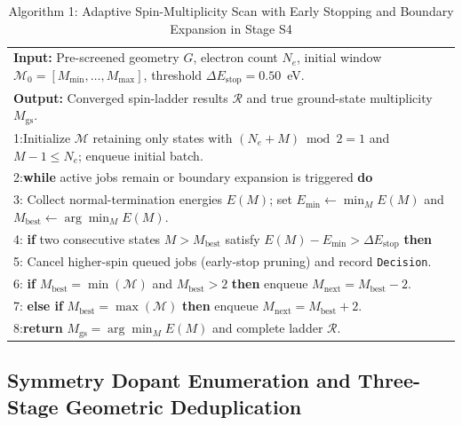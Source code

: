 \documentclass[journal=jcisd8,manuscript=article]{achemso}
\begin{document}
\begin{table}[htbp]
  \centering
  \caption{Algorithm 1: Adaptive Spin-Multiplicity Scan with Early Stopping and Boundary Expansion in Stage S4}
  \label{tab:alg1}
  \small
  \begin{tabular}{p{14.8cm}}
    \toprule
    \textbf{Input:} Pre-screened geometry $G$, electron count $N_e$, initial window $\mathcal{M}_0 = [M_{\min}, \dots, M_{\max}]$, threshold $\Delta E_{\text{stop}} = 0.50$~eV. \\
    \textbf{Output:} Converged spin-ladder results $\mathcal{R}$ and true ground-state multiplicity $M_{\text{gs}}$. \\
    \midrule
    1:\quad Initialize $\mathcal{M}$ retaining only states with $(N_e + M) \bmod 2 = 1$ and $M - 1 \le N_e$; enqueue initial batch. \\
    2:\quad \textbf{while} active jobs remain or boundary expansion is triggered \textbf{do} \\
    3:\quad \hspace{1.2em} Collect normal-termination energies $E(M)$; set $E_{\min} \leftarrow \min_M E(M)$ and $M_{\text{best}} \leftarrow \arg\min_M E(M)$. \\
    4:\quad \hspace{1.2em} \textbf{if} two consecutive states $M > M_{\text{best}}$ satisfy $E(M) - E_{\min} > \Delta E_{\text{stop}}$ \textbf{then} \\
    5:\quad \hspace{2.4em} Cancel higher-spin queued jobs (early-stop pruning) and record \texttt{Decision}. \\
    6:\quad \hspace{1.2em} \textbf{if} $M_{\text{best}} = \min(\mathcal{M})$ and $M_{\text{best}} > 2$ \textbf{then} enqueue $M_{\text{next}} = M_{\text{best}} - 2$. \\
    7:\quad \hspace{1.2em} \textbf{else if} $M_{\text{best}} = \max(\mathcal{M})$ \textbf{then} enqueue $M_{\text{next}} = M_{\text{best}} + 2$. \\
    8:\quad \textbf{return} $M_{\text{gs}} = \arg\min_M E(M)$ and complete ladder $\mathcal{R}$. \\
    \bottomrule
  \end{tabular}
\end{table}

\subsection{Symmetry Dopant Enumeration and Three-Stage Geometric Deduplication}
\end{document}
